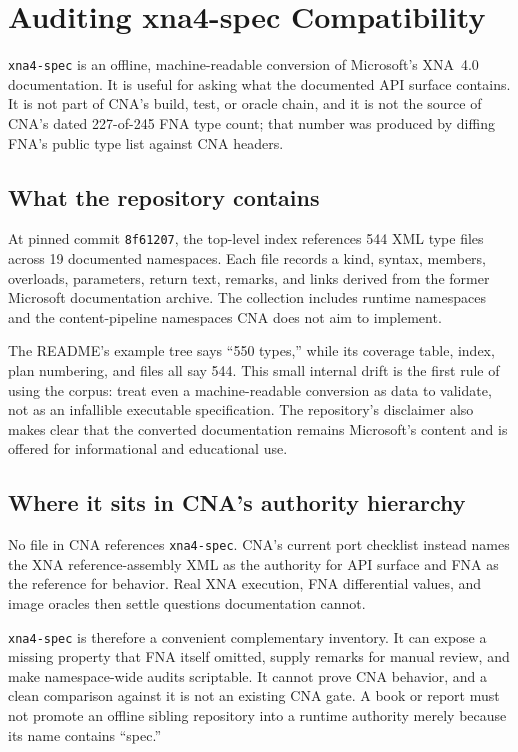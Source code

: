 \chapter{Auditing xna4-spec Compatibility}
\label{ch:xna4-spec-auditing}

\texttt{xna4-spec} is an offline, machine-readable conversion of Microsoft's XNA~4.0
documentation.  It is useful for asking what the documented API surface contains.  It is not part
of CNA's build, test, or oracle chain, and it is not the source of CNA's dated 227-of-245 FNA type
count; that number was produced by diffing FNA's public type list against CNA headers.

\section{What the repository contains}

At pinned commit \texttt{8f61207}, the top-level index references 544 XML type files across 19
documented namespaces.  Each file records a kind, syntax, members, overloads, parameters, return
text, remarks, and links derived from the former Microsoft documentation archive.  The collection
includes runtime namespaces and the content-pipeline namespaces CNA does not aim to implement.

The README's example tree says ``550 types,'' while its coverage table, index, plan numbering, and
files all say 544.  This small internal drift is the first rule of using the corpus: treat even a
machine-readable conversion as data to validate, not as an infallible executable specification.
The repository's disclaimer also makes clear that the converted documentation remains Microsoft's
content and is offered for informational and educational use.

\section{Where it sits in CNA's authority hierarchy}

No file in CNA references \texttt{xna4-spec}.  CNA's current port checklist instead names the XNA
reference-assembly XML as the authority for API surface and FNA as the reference for behavior.
Real XNA execution, FNA differential values, and image oracles then settle questions documentation
cannot.

\texttt{xna4-spec} is therefore a convenient complementary inventory.  It can expose a missing
property that FNA itself omitted, supply remarks for manual review, and make namespace-wide audits
scriptable.  It cannot prove CNA behavior, and a clean comparison against it is not an existing CNA
gate.  A book or report must not promote an offline sibling repository into a runtime authority
merely because its name contains ``spec.''

